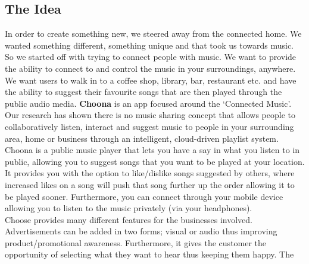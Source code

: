 \subsection{The Idea}
In order to create something new, we steered away from the connected home.  We wanted something different, something unique and that took us towards music.  So we started off with trying to connect people with music.  We want to provide the ability to connect to and control the music in your surroundings, anywhere.  We want users to walk in to a coffee shop, library, bar, restaurant etc. and have the ability to suggest their favourite songs that are then played through the public audio media.  \textbf{Choona} is an app focused around the `Connected Music'.  Our research has shown there is no music sharing concept that allows people to collaboratively listen, interact and suggest music to people in your surrounding area, home or business through an intelligent, cloud-driven playlist system.  \\
Choona is a public music player that lets you have a say in what you listen to in public, allowing you to suggest songs that you want to be played at your location.  It provides you with the option to like/dislike songs suggested by others, where increased likes on a song will push that song further up the order allowing it to be played sooner.  Furthermore, you can connect through your mobile device allowing you to listen to the music privately (via your headphones).  \\
Choose provides many different features for the businesses involved.  Advertisements can be added in two forms; visual or audio thus improving product/promotional awareness.  Furthermore, it gives the customer the opportunity of selecting what they want to hear thus keeping them happy.  The 